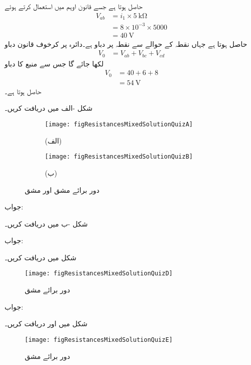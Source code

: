 حاصل ہوتا ہے جسے قانون اوہم میں استعمال کرتے ہوئے
\begin{align*}
V_{ab}&=i_1 \times \SI{5}{\kilo\ohm}\\
&=8\times 10^{-3}\times 5000\\
&=\SI{40}{\volt}
\end{align*}
حاصل ہوتا ہے جہاں  نقطہ  کے حوالے سے نقطہ  پر دباو ہے۔دائرہ  پر کرخوف قانون دباو
\begin{align*}
V_0&=V_{ab}+V_{bc}+V_{cd}
\end{align*}
لکھا جائے گا جس سے منبع کا دباو
\begin{align*}
V_0&=40+6+8\\
&=\SI{54}{\volt}
\end{align*}
حاصل ہوتا ہے۔
\FloatBarrier

شکل -الف میں  دریافت کریں۔
\begin{figure}
\centering
\begin{subfigure}{0.5\textwidth}
\centering
\texttt{[image: figResistancesMixedSolutionQuizA]}
\caption*{(الف)}
\end{subfigure}%
\begin{subfigure}{0.5\textwidth}
\centering
\texttt{[image: figResistancesMixedSolutionQuizB]}
\caption*{(ب)}
\end{subfigure}%
\caption{دور برائے مشق  اور مشق }
\label{شکل_مزاحمتی_متعدد_مشق_الف}
\end{figure}

جواب:

شکل -ب میں  دریافت کریں۔  

جواب: 

شکل  میں  دریافت کریں۔
\begin{figure}
\centering
\texttt{[image: figResistancesMixedSolutionQuizD]}
\caption{دور برائے مشق }
\label{شکل_مزاحمتی_متعدد_مشق_پ}
\end{figure}

جواب:
\FloatBarrier

شکل  میں   اور  دریافت کریں۔
\begin{figure}
\centering
\texttt{[image: figResistancesMixedSolutionQuizE]}
\caption{دور برائے مشق }
\label{شکل_مزاحمتی_متعدد_مشق_ت}
\end{figure}


